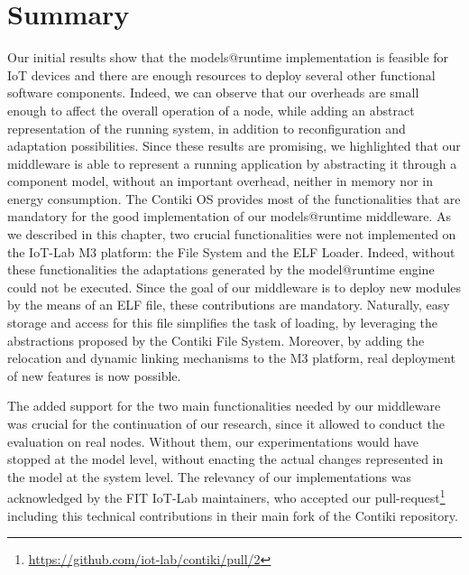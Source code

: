 \section{Summary}
Our initial results show that the models@runtime implementation is feasible for IoT devices and there are enough resources to deploy several other functional software components.
Indeed, we can observe that our overheads are small enough to affect the overall operation of a node, while adding an abstract representation of the running system, in addition to reconfiguration and adaptation possibilities.
Since these results are promising, we highlighted that our middleware is able to represent a running application by abstracting it through a component model, without an important overhead, neither in memory nor in energy consumption.
The Contiki OS provides most of the functionalities that are mandatory for the good implementation of our models@runtime middleware.
As we described in this chapter, two crucial functionalities were not implemented on the IoT-Lab M3 platform: the File System and the ELF Loader.
Indeed, without these functionalities the adaptations generated by the model@runtime engine could not be executed.
Since the goal of our middleware is to deploy new modules by the means of an ELF file, these contributions are mandatory.
Naturally, easy storage and access for this file simplifies the task of loading, by leveraging the abstractions proposed by the Contiki File System.
Moreover, by adding the relocation and dynamic linking mechanisms to the M3 platform, real deployment of new features is now possible.

The added support for the two main functionalities needed by our middleware was crucial for the continuation of our research, since it allowed to conduct the evaluation on real nodes.
Without them, our experimentations would have stopped at the model level, without enacting the actual changes represented in the model at the system level.
The relevancy of our implementations was acknowledged by the FIT IoT-Lab maintainers, who accepted our pull-request\footnote{\url{https://github.com/iot-lab/contiki/pull/2}} including this technical contributions in their main fork of the Contiki repository.

